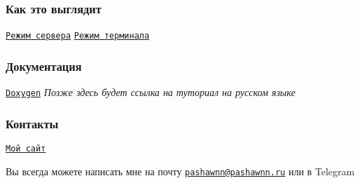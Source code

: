  \subsubsection*{Как это выглядит}

\href{https://raw.githubusercontent.com/PashaWNN/wax/master/docs/web.png}{\tt Режим сервера} \href{https://raw.githubusercontent.com/PashaWNN/wax/master/docs/terminal.png}{\tt Режим терминала}

\subsubsection*{Документация}

\href{http://pashawnn.github.io/wax/docs}{\tt Doxygen} {\itshape Позже здесь будет ссылка на туториал на русском языке}

\subsubsection*{Контакты}

\href{http://pashawnn.ru}{\tt Мой сайт}

Вы всегда можете написать мне на почту \href{mailto:pashawnn@pashawnn.ru}{\tt pashawnn@pashawnn.\+ru} или в Telegram  
